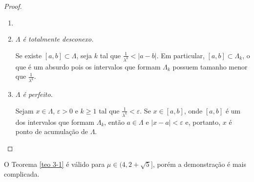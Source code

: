 \begin{proof}
\begin{enumerate}[label=\alph*)]\item[]
\item \textit{$\Lambda$ é totalmente desconexo.}

Se existe $[a, b] \subset \Lambda$, seja $k$ tal que $\frac{1}{\lambda^k} < |a - b|$.
Em particular, $[a, b] \subset \Lambda_k$, o que é um absurdo pois os intervalos que formam $\Lambda_k$ possuem tamanho menor que $\frac{1}{\lambda^k}$.

\item \textit{$\Lambda$ é perfeito.}

Sejam $x \in \Lambda$, $\varepsilon > 0$ e $k \geq 1$ tal que $\frac{1}{\lambda^k} < \varepsilon$.
Se $x \in [a, b]$, onde $[a, b]$ é um dos intervalos que formam $\Lambda_k$, então $a \in \Lambda$ e $|x - a| < \varepsilon$ e, portanto, $x$ é ponto de acumulação de $\Lambda$.
\end{enumerate}
\end{proof}

O Teorema \ref{teo 3-1} é válido para $\mu \in (4, 2 + \sqrt{5}]$, porém a demonstração é mais complicada.
